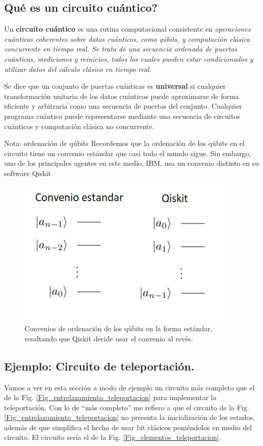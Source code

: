 \documentclass[a4paper,11pt]{book} %
\numberwithin{equation}{chapter}
\begin{document}
		\subsection{Qué es un circuito cuántico?}
		
Un \textbf{circuito cuántico} es una rutina computacional consistente en \textit{operaciones cuánticas coherentes sobre datos cuánticos, como qúbits, y computación clásica concurrente en tiempo real. Se trata de una secuencia ordenada de puertas cuánticas, mediciones y reinicios, todos los cuales pueden estar condicionados y utilizar datos del cálculo clásico en tiempo real.}

Se dice que un conjunto de puertas cuánticas es \textbf{universal} si cualquier transformación unitaria de los datos cuánticos puede aproximarse de forma eficiente y arbitraria como una secuencia de puertas del conjunto. Cualquier programa cuántico puede representarse mediante una secuencia de circuitos cuánticos y computación clásica no concurrente.

	\begin{mybox_blue}{Nota: ordenación de qúbits}
	Recordemos que la ordenación de los qúbits en el circuito tiene un convenio estándar que casi todo el mundo sigue. Sin embargo,
	uno de los principales agentes en este medio, IBM, usa un convenio distinto en su software Qiskit
	\begin{figure}[H]
	\centering 
	\includegraphics[width=0.4\linewidth]{Figuras/Fig_multiqubits_convenios_ordenacion}
	\caption{Convenios de ordenación de los qúbits en la forma estándar, resaltando que Qiskit decide usar el convenio al revés.}
	\label{Fig_elementos_convenios_ordenacion}
	\end{figure}
	\end{mybox_blue}
	
		\subsection{Ejemplo: Circuito de teleportación.}

Vamos a ver en esta sección a modo de ejemplo un circuito más completo que el de la Fig. \ref{Fig_entrelazamiento_teleportacion} para implementar la teleportación. Con lo de ``más completo'' me refiero a que el circuito de la Fig. \ref{Fig_entrelazamiento_teleportacion} no presenta la inicialización de los estados, además de que simplifica el hecho de usar bit clásicos poniéndolos en medio del circuito. El circuito sería el de la Fig. \ref{Fig_elementos_teleportacion}.
\end{document}
